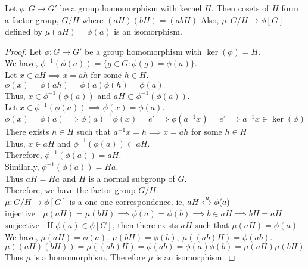 \begin{theorem}
	Let $\phi : G \to G'$ be a group homomorphism with kernel $H$. Then cosets of $H$ form a factor group, $G/H$ where $(aH)(bH) = (abH)$ Also, $\mu : G/H \to \phi[G]$ defined by $\mu(aH) = \phi(a)$ is an isomorphism.
\end{theorem}
\begin{proof}
	Let $\phi : G \to G'$ be a group homomorphism with $\ker(\phi) = H$.\\
	We have, $\phi^{-1}(\phi(a)) = \{ g \in G : \phi(g) = \phi(a) \}$.\\

	Let $x \in aH \implies x = ah$ for some $h \in H$.\\
	$\phi(x) = \phi(ah) = \phi(a)\phi(h) = \phi(a)$\\
	Thus, $x \in \phi^{-1}(\phi(a))$ and $aH \subset \phi^{-1}(\phi(a))$.\\

	Let $x \in \phi^{-1}(\phi(a)) \implies \phi(x) = \phi(a)$.\\
	$\phi(x) = \phi(a) \implies \phi(a)^{-1} \phi(x) = e' \implies \phi(a^{-1}x) = e' \implies a^{-1}x \in \ker(\phi)$\\
	There exists $h \in H$ such that $a^{-1}x = h \implies x = ah$ for some $h \in H$\\
	Thus, $x \in aH$ and $\phi^{-1}(\phi(a)) \subset aH$.\\
	Therefore, $\phi^{-1}(\phi(a)) = aH$.\\
	
	Similarly, $\phi^{-1}(\phi(a)) = Ha$.\\
	Thus $aH = Ha$ and $H$ is a normal subgroup of $G$.\\
	Therefore, we have the factor group $G/H$.\\

	$\mu : G/H \to \phi[G]$ is a one-one correspondence. ie, $aH \xleftrightarrow{\mu} \phi(a)$\\
	injective : $\mu(aH) = \mu(bH) \implies \phi(a) = \phi(b) \implies b \in aH \implies bH = aH$\\
	surjective : If $\phi(a) \in \phi[G]$, then there exists $aH$ such that  $\mu(aH) = \phi(a)$\\

	We have, $\mu(aH) = \phi(a),\ \mu(bH) = \phi(b),\ \mu((ab)H)  = \phi(ab)$.\\
	$\mu((aH)(bH)) = \mu((ab)H) = \phi(ab) = \phi(a)\phi(b) = \mu(aH)\mu(bH)$\\
	Thus $\mu$ is a homomorphism. Therefore $\mu$ is an isomorphism.
\end{proof}

